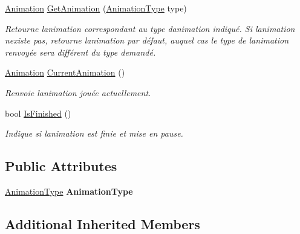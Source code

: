 \begin{DoxyCompactItemize}
\hyperlink{class_tentacle_slicers_1_1graphics_1_1_animation}{Animation} \hyperlink{class_tentacle_slicers_1_1graphics_1_1_animation_handler_a9689c8aa6eda698f6c70f2d4722d2f67}{Get\+Animation} (\hyperlink{namespace_tentacle_slicers_1_1graphics_a9c92bd633d714099730f10897a01950b}{Animation\+Type} type)
\begin{DoxyCompactList}\small\item\em Retourne l\textquotesingle{}animation correspondant au type d\textquotesingle{}animation indiqué. Si l\textquotesingle{}animation n\textquotesingle{}existe pas, retourne l\textquotesingle{}animation par défaut, auquel cas le type de l\textquotesingle{}animation renvoyée sera différent du type demandé. \end{DoxyCompactList}\item 
\hyperlink{class_tentacle_slicers_1_1graphics_1_1_animation}{Animation} \hyperlink{class_tentacle_slicers_1_1graphics_1_1_animation_handler_a7517212410c75974b516371e74023874}{Current\+Animation} ()
\begin{DoxyCompactList}\small\item\em Renvoie l\textquotesingle{}animation jouée actuellement. \end{DoxyCompactList}\item 
bool \hyperlink{class_tentacle_slicers_1_1graphics_1_1_animation_handler_a12a0833af42233820bdcecf6bcf92403}{Is\+Finished} ()
\begin{DoxyCompactList}\small\item\em Indique si l\textquotesingle{}animation est finie et mise en pause. \end{DoxyCompactList}\end{DoxyCompactItemize}
\subsection*{Public Attributes}
\begin{DoxyCompactItemize}
\item 
\mbox{\label{class_tentacle_slicers_1_1graphics_1_1_animation_handler_a506e01c8587c17d94bf73bf913ab7454}} 
\hyperlink{namespace_tentacle_slicers_1_1graphics_a9c92bd633d714099730f10897a01950b}{Animation\+Type} {\bfseries Animation\+Type}
\end{DoxyCompactItemize}
\subsection*{Additional Inherited Members}



